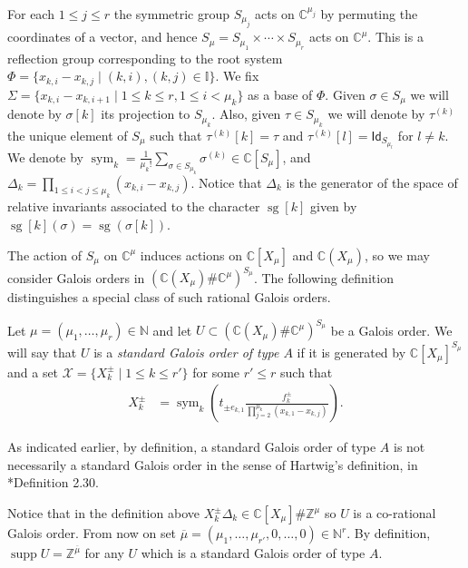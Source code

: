 \documentclass[11pt,fleqn]{amsart}
\newcommand\NN{\mathbb N}
\newcommand\CC{\mathbb C}
\newcommand\ZZ{\mathbb Z}
\newcommand\II{\mathbb I}
\newcommand\Id{\mathsf{Id}}
\DeclareMathOperator\sym{sym}
\DeclareMathOperator\sg{sg}
\DeclareMathOperator\supp{supp}
\begin{document}
For each $1 \leq j \leq r$ the symmetric group $S_{\mu_j}$ acts on 
$\CC^{\mu_j}$ by permuting the coordinates of a vector, and hence $S_\mu = 
S_{\mu_1} \times \cdots \times S_{\mu_r}$ acts on $\CC^\mu$. This is a 
reflection group corresponding to the root system $\Phi = \{x_{k,i} - x_{k,j} 
\mid (k,i),(k,j) \in \II\}$. We fix $\Sigma = \{x_{k,i} - x_{k,i+1} \mid 1 
\leq k \leq r, 1 \leq i < \mu_k\}$  as a base of $\Phi$.
Given $\sigma \in S_{\mu}$ we will denote by $\sigma[k]$ its projection to
$S_{\mu_k}$. Also, given $\tau \in S_{\mu_k}$ we will denote by $\tau^{(k)}$
the unique element of $S_\mu$ such that $\tau^{(k)}[k] = \tau$ and 
$\tau^{(k)}[l] = \Id_{S_{\mu_l}}$ for $l \neq k$. We denote by 
$\sym_k = \frac{1}{\mu_k!}\sum_{\sigma \in S_{\mu_k}} \sigma^{(k)} \in 
\CC[S_\mu]$, and $\Delta_k= \prod_{1 \leq i < j \leq \mu_k}(x_{k,i}-x_{k,j})$. 
Notice that $\Delta_k$ is the generator of the space of relative invariants
associated to the character $\sg[k]$ given by $\sg[k](\sigma)=\sg(\sigma[k])$.

The action of $S_\mu$ on $\CC^\mu$ induces actions on $\CC[X_\mu]$ and 
$\CC(X_\mu)$, so we may consider Galois orders in $(\CC(X_\mu) \# 
\CC^\mu)^{S_\mu}$. The following definition distinguishes a special class of 
such rational Galois orders.

\begin{Definition}
Let $\mu = (\mu_1, \ldots, \mu_r) \in \NN$ and let $U \subset (\CC(X_\mu) \# 
\CC^\mu)^{S_\mu}$ be a Galois order. We will say that $U$ is a \emph{standard 
Galois order of type $A$} if it is generated by $\CC[X_\mu]^{S_\mu}$ and a set 
$\mathcal X = \{X_k^\pm \mid 1 \leq k \leq r'\}$ for some $r' \leq r$ such that
\begin{align*}
X_k^\pm 
 &= \sym_k \left( 
  t_{\pm e_{k,1}}
 \frac{f_k^\pm}{\prod_{j = 2}^{\mu_k}(x_{k,1} - x_{k,j})} 
 \right).
\end{align*}
\end{Definition}
\begin{Remark*}
As indicated earlier, by definition, a standard Galois order of type $A$ is 
not necessarily a standard Galois order in the sense of Hartwig's definition, 
in \cite{Hart-rational-galois}*{Definition 2.30}. 
\end{Remark*}

Notice that in the definition above $X_k^\pm \Delta_k  \in \CC[X_\mu] \# 
\ZZ^\mu$ so $U$ is a co-rational Galois order. From now on set $\overline \mu = 
(\mu_1, \ldots, \mu_{r'}, 0, \ldots, 0) \in \NN^r$.  By definition,   
 $\supp U = \ZZ^{\overline \mu}$ for any $U$ which is a standard 
Galois order of type $A$. 
\end{document}
